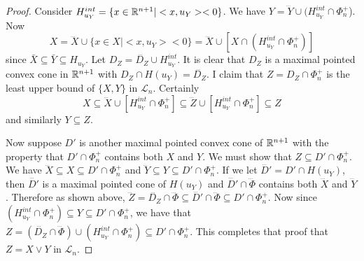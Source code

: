 \documentclass[psamsfonts]{amsart}
\numberwithin{equation}{subsection}
\theoremstyle{plain}
\theoremstyle{definition}
\theoremstyle{remark}
\begin{document}
\begin{proof}
Consider $H_{u_Y}^{int} = \{x \in \Bbb{R}^{n + 1} | <x, u_Y> < 0 \}$. We have $Y = \dddot{Y} \cup (H_{u_Y}^{int} \cap \Phi_{n}^+$). Now 
$$X = \dddot{X} \cup \{x \in X | <x, u_Y> < 0\} = \dddot{X} \cup [X \cap (H_{u_Y}^{int} \cap \Phi_{n}^+)]$$
 since $\bar{X} \subseteq \bar{Y} \subseteq H_{u_Y}$. 
  Let $D_Z = \dddot{D_{Z}} \cup H_{u_Y}^{int}$. It is clear  that $D_Z$ is a maximal pointed convex cone in $\Bbb{R}^{n + 1}$ with 
  $D_Z \cap H(u_Y) = \dddot{D_Z}$. I claim that  $Z = D_Z \cap \Phi^+_n$ is the  least upper bound of $\{X, Y\}$ in $\mathcal{L}_n$. Certainly 
$$X\subseteq \dddot{X} \cup [  H^{int}_{u_Y} \cap \Phi^+_n] 
\subseteq \dddot{Z} \cup [  H^{int}_{u_Y} \cap \Phi^+_n]  \subseteq Z$$
 and similarly $Y \subseteq Z$. 

Now suppose $D'$ is another maximal pointed convex cone of $\Bbb{R}^{n + 1}$ with the property that $D' \cap \Phi_n^+$ contains both $X$ and $Y$. We must show that 
$Z \subseteq D' \cap \Phi_n^+$. We have $\dddot{X} \subseteq X \subseteq D' \cap \Phi_n^+$ and $\dddot{Y} \subseteq Y \subseteq D' \cap \Phi_n^+$. If we let $\dddot{D'} = D' \cap H(u_Y)$, then $\dddot{D'} $ is a maximal pointed cone of $H(u_Y)$ and $\dddot{D'} \cap \dddot{\Phi}$ contains both $\dddot{X}$ and $\dddot{Y}$. Therefore as shown above, $\dddot{Z} = \dddot{D_{Z}}  \cap \dddot{\Phi}   \subseteq \dddot{D'} \cap \dddot{\Phi}  \subseteq D' \cap \Phi_n^+$. Now since 
 $(H_{u_Y}^{int} \cap \Phi_{n}^+)  \subseteq Y \subseteq   D' \cap \Phi_n^+$, we have that $Z =  (\dddot{D_{Z}}  \cap\dddot{\Phi})
 \cup (H_{u_Y}^{int} \cap \Phi_{n}^+)  \subseteq D' \cap \Phi_n^+$. This completes that proof that $Z = X\vee Y$ in $\mathcal{L}_n$. 
\end{proof}
\end{document}
